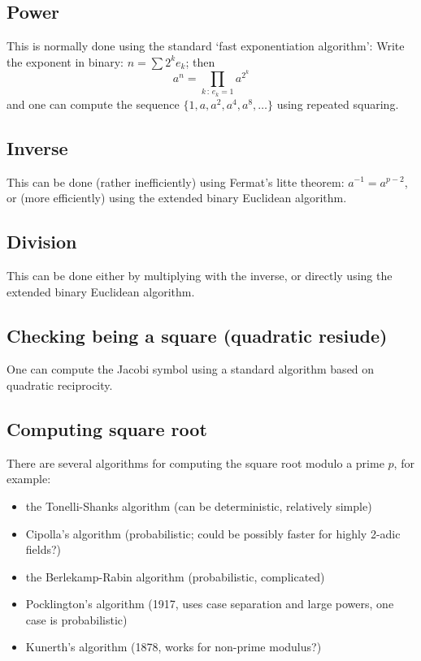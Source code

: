 \documentclass[12pt,draft,a4paper,openany,oneside]{amsbook}
\theoremstyle{plain}
\theoremstyle{definition}
\begin{document}
\subsection{Power}
This is normally done using the standard `fast exponentiation algorithm':
Write the exponent in binary: $n=\sum 2^k e_k$; then 
\[ a^n = \prod_{k\,:\,e_k=1} a^{2^{k}} \]
and one can compute the sequence $\{1,a,a^2,a^4,a^8,\dots\}$ using repeated
squaring.

\subsection{Inverse}
This can be done (rather inefficiently) using Fermat's litte theorem:
$a^{-1} = a^{p-2}$, or (more efficiently) using the extended binary 
Euclidean algorithm.

\subsection{Division}
This can be done either by multiplying with the inverse, or directly using
the extended binary Euclidean algorithm.

\subsection{Checking being a square (quadratic resiude)}
One can compute the Jacobi symbol using a standard algorithm based
on quadratic reciprocity.

\subsection{Computing square root}
There are several algorithms for computing the square root modulo a prime $p$, for example:
\begin{itemize}
\item the Tonelli-Shanks algorithm (can be deterministic, relatively simple)
\item Cipolla's algorithm (probabilistic; could be possibly faster for highly 2-adic fields?)
\item the Berlekamp-Rabin algorithm (probabilistic, complicated)
\item Pocklington's algorithm (1917, uses case separation and large powers, one case is probabilistic)
\item Kunerth's algorithm (1878, works for non-prime modulus?)
\end{itemize}

\end{document}
